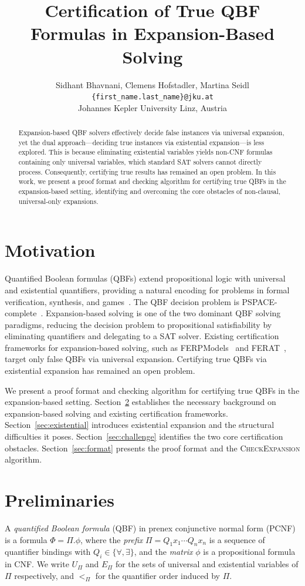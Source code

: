 \documentclass{article}
\title{Certification of True QBF Formulas in Expansion-Based Solving}
\author{
  Sidhant Bhavnani, Clemens Hofstadler, Martina Seidl \\
  \texttt{\{first\_name.last\_name\}@jku.at} \\
  Johannes Kepler University Linz, Austria \\
}
\date{}
\begin{document}
\maketitle
\begin{abstract}
    Expansion-based QBF solvers effectively decide false instances via universal expansion, yet the dual approach—deciding true instances via existential expansion—is less explored. This is because eliminating existential variables yields non-CNF formulas containing only universal variables, which standard SAT solvers cannot directly process. Consequently, certifying true results has remained an open problem. In this work, we present a proof format and checking algorithm for certifying true QBFs in the expansion-based setting, identifying and overcoming the core obstacles of non-clausal, universal-only expansions.
\end{abstract}


\section{Motivation}

Quantified Boolean formulas (QBFs) extend propositional logic with universal and
existential quantifiers, providing a natural encoding for problems in formal
verification, synthesis, and games~\cite{survey}. The QBF decision problem
is PSPACE-complete~\cite{survey}. Expansion-based solving is one of the two dominant
QBF solving paradigms, reducing the decision problem to propositional
satisfiability by eliminating quantifiers and delegating to a SAT solver.
Existing certification frameworks for expansion-based solving, such as
FERPModels~\cite{ferpmodels} and FERAT~\cite{ferat}, target only false QBFs via universal
expansion. Certifying true QBFs via existential expansion has remained an open
problem.

We present a proof format and checking algorithm for certifying true QBFs in the
expansion-based setting. Section~\ref{sec:preliminaries} establishes the necessary
background on expansion-based solving and existing certification frameworks.
Section~\ref{sec:existential} introduces existential expansion and the structural
difficulties it poses. Section~\ref{sec:challenge} identifies the two core
certification obstacles. Section~\ref{sec:format} presents the proof format and
the \textsc{CheckExpansion} algorithm.

\section{Preliminaries}
\label{sec:preliminaries}
A \emph{quantified Boolean formula} (QBF) in prenex conjunctive normal form (PCNF)
is a formula $\Phi = \Pi.\phi$, where the \emph{prefix} $\Pi = Q_1x_1\cdots Q_nx_n$
is a sequence of quantifier bindings with $Q_i \in \{\forall, \exists\}$, and the
\emph{matrix} $\phi$ is a propositional formula in CNF. We write $U_\Pi$ and $E_\Pi$
for the sets of universal and existential variables of $\Pi$ respectively, and
$<_\Pi$ for the quantifier order induced by $\Pi$.
\end{document}
